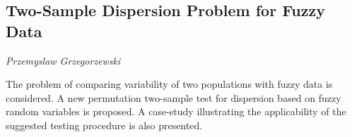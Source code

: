 \documentclass[../booklet.tex]{subfiles}
\begin{document}
\subsection[Two-Sample Dispersion Problem for Fuzzy Data. {\it Przemyslaw Grzegorzewski}]{Two-Sample Dispersion Problem for Fuzzy Data}

\begin{center}
  {\it Przemyslaw Grzegorzewski}
\end{center}



The problem of comparing variability of two populations with fuzzy data is considered. A new permutation two-sample test for dispersion based on fuzzy random variables is proposed. A case-study illustrating the applicability of the suggested testing procedure is also presented.

\end{document}
